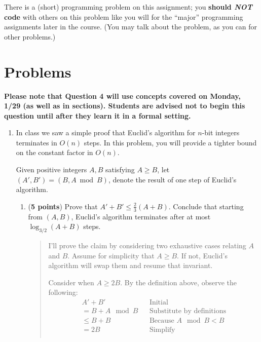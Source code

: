 \documentclass[11pt]{article}
\begin{document}
There is a (short) programming problem on this assignment; you {\bf should \textit{NOT} code} with others on
this problem like you will for the ``major'' programming assignments later in the course. (You may
talk about the problem, as you can for other problems.)


\section*{Problems}

\textbf{Please note that Question 4 will use concepts covered on Monday, 1/29 (as well as in sections). Students are advised not to begin this question until after they learn it in a formal setting.}

\begin{enumerate}[leftmargin=*]


\item In class we saw a simple proof that Euclid's algorithm for $n$-bit integers terminates in $O(n)$ steps. In this problem, you will provide a tighter bound on the constant factor in $O(n)$.

Given positive integers $A, B$ satisfying $A \ge B$, let $(A',B') = (B,A \bmod B)$, denote the result of one step of Euclid's algorithm.

\begin{enumerate}
    \item (\textbf{5 points}) Prove that $A' + B' \le \frac{2}{3}(A + B)$. Conclude that starting from $(A,B)$, Euclid's algorithm terminates after at most $\log_{3/2}(A+B)$ steps.
      \begin{quote}
        \color{purple}
        I'll prove the claim by considering two exhaustive cases relating $A$ and $B$. Assume for simplicity that $A \geq B$. If not, Euclid's algorithm will swap them and resume that invariant. 

        \medskip
        Consider when $A \geq 2B$. By the definition above, observe the following: 
        \begin{align*}
            && A' + B' && \text{Initial} && \\
            && = B + A \mod B && \text{Substitute by definitions} && \\
            && \leq B + B && \text{Because $A \mod B < B$} && \\
            && = 2B && \text{Simplify} && \\
        \end{align*} 


\end{quote}
\end{enumerate}
\end{enumerate}
\end{document}
